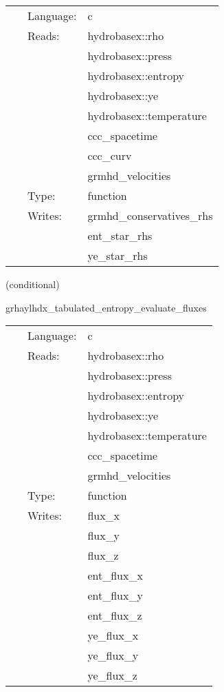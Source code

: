 \hspace{5mm}

 \begin{tabular*}{160mm}{cll} 
~ & Language:  & c \\ 
~ & Reads:  & hydrobasex::rho \\ 
~& ~ &hydrobasex::press\\ 
~& ~ &hydrobasex::entropy\\ 
~& ~ &hydrobasex::ye\\ 
~& ~ &hydrobasex::temperature\\ 
~& ~ &ccc\_spacetime\\ 
~& ~ &ccc\_curv\\ 
~& ~ &grmhd\_velocities\\ 
~ & Type:  & function \\ 
~ & Writes:  & grmhd\_conservatives\_rhs \\ 
~& ~ &ent\_star\_rhs\\ 
~& ~ &ye\_star\_rhs\\ 
\end{tabular*} 


\vspace{5mm}

   (conditional) 

\hspace{5mm} grhaylhdx\_tabulated\_entropy\_evaluate\_fluxes 

\hspace{5mm}{\it entropy+tabulated version of grhaylhdx\_evaluate\_fluxes } 


\hspace{5mm}

 \begin{tabular*}{160mm}{cll} 
~ & Language:  & c \\ 
~ & Reads:  & hydrobasex::rho \\ 
~& ~ &hydrobasex::press\\ 
~& ~ &hydrobasex::entropy\\ 
~& ~ &hydrobasex::ye\\ 
~& ~ &hydrobasex::temperature\\ 
~& ~ &ccc\_spacetime\\ 
~& ~ &grmhd\_velocities\\ 
~ & Type:  & function \\ 
~ & Writes:  & flux\_x \\ 
~& ~ &flux\_y\\ 
~& ~ &flux\_z\\ 
~& ~ &ent\_flux\_x\\ 
~& ~ &ent\_flux\_y\\ 
~& ~ &ent\_flux\_z\\ 
~& ~ &ye\_flux\_x\\ 
~& ~ &ye\_flux\_y\\ 
~& ~ &ye\_flux\_z\\ 
\end{tabular*} 


